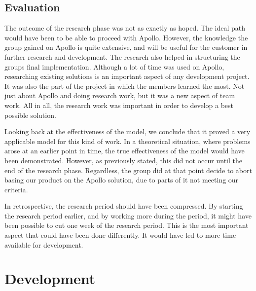 
\subsection{Evaluation}
\label{subsec:project_evaluation-research_phase-evaluation}

The outcome of the research phase was not as exactly as hoped. The ideal path would have been to be able to proceed with Apollo. However, the knowledge the group gained on Apollo is quite extensive, and will be useful for the customer in further research and development. The research also helped in structuring the groups final implementation. Although a lot of time was used on Apollo, researching existing solutions is an important aspect of any development project. It was also the part of the project in which the members learned the most. Not just about Apollo and doing research work, but it was a new aspect of team work. All in all, the research work was important in order to develop a best possible solution.

Looking back at the effectiveness of the model, we conclude that it proved a very applicable model for this kind of work. In a theoretical situation, where problems arose at an earlier point in time, the true effectiveness of the model would have been demonstrated. However, as previously stated, this did not occur until the end of the research phase. Regardless, the group did at that point decide to abort basing our product on the Apollo solution, due to parts of it not meeting our criteria.

In retrospective, the research period should have been compressed. By starting the research period earlier, and by working more during the period, it might have been possible to cut one week of the research period. This is the most important aspect that could have been done differently. It would have led to more time available for development. 

\section{Development}
\label{sec:project_evaluation-development}


